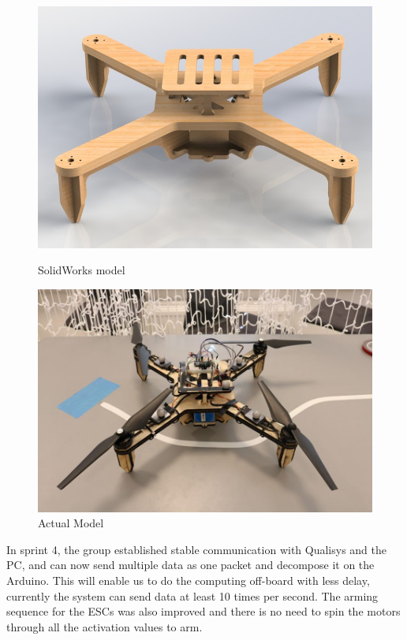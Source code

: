 \begin{figure}[h]
        \centering
         \begin{minipage}[b]{0.4\textwidth}
            \includegraphics[width = 1\textwidth]{VAPIQ-PICTURES/FixedPitchRender}
              \caption{SolidWorks model}
            \label{fig:plywood}
        \end{minipage}
        \hfill
        \begin{minipage}[b]{0.4\textwidth}
            \includegraphics[width = \textwidth]{VAPIQ-PICTURES/FirstFixedPitch}
            \caption{Actual Model}
            \label{fig:actual}
        \end{minipage}
\end{figure}

In sprint 4, the group established stable communication with Qualisys and the PC, and can now send multiple data as one packet and decompose it on the Arduino. This will enable us to do the computing off-board with less delay, currently the system can send data at least 10 times per second. The arming sequence for the ESCs was also improved and there is no need to spin the motors through all the activation values to arm. \bigskip

